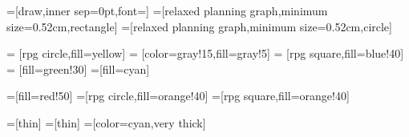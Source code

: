 
\subtitle{}
\date{April 29, 2020}


\usetikzlibrary{shapes}

=[draw,inner sep=0pt,font=\small]
=[relaxed planning graph,minimum size=0.52cm,rectangle]
=[relaxed planning graph,minimum size=0.52cm,circle]


=        [rpg circle,fill=yellow]
=    [color=gray!15,fill=gray!5]
=    [rpg square,fill=blue!40]
 = [fill=green!30]
=[fill=cyan]

=[fill=red!50]
=[rpg circle,fill=orange!40]
=[rpg square,fill=orange!40]

=[thin]
=[thin]
=[color=cyan,very thick]

\newcommand{\markplusone}[1]{\path (#1) +(-0.04cm,0.28cm) node {\tiny $+1$};}
\newcommand{\markopnode}[3][0.35cm]{\path (#2) +(0cm,#1) node {\tiny
    \ensuremath{#3}};}
\newcommand{\markopnodeff}[3][0.30cm]{\path (#2) +(0cm,#1) node {\tiny
    \ensuremath{#3}};}
\newcommand{\markopcost}[2]{\path (#1) +(0.45cm,0.15cm) node {\tiny $+#2$};}

\newcommand{\pre}{\ensuremath{\textit{pre}}}
\newcommand{\add}{\ensuremath{\textit{add}}}
\newcommand{\del}{\ensuremath{\textit{del}}}
\newcommand{\relaxation}[1]{\ensuremath{#1^+}}
\newcommand{\hplus}{\ensuremath{h^+}}
\newcommand{\hmax}{\ensuremath{h^{\textup{max}}}}
\newcommand{\hadd}{\ensuremath{h^{\textup{add}}}}
\newcommand{\hff}{\ensuremath{h^{\textup{FF}}}}

